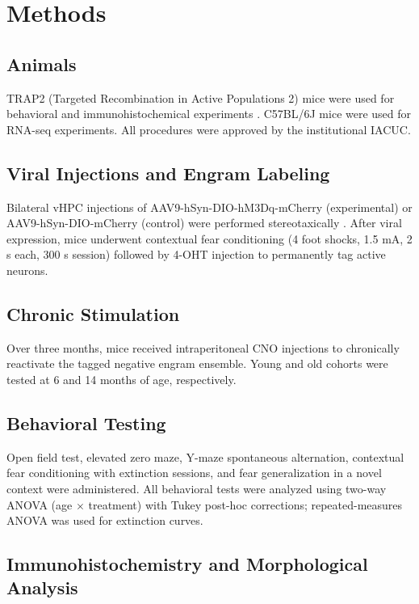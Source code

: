 \documentclass[11pt]{article}
\begin{document}
\section{Methods}

\subsection{Animals}

TRAP2 (Targeted Recombination in Active Populations 2) mice were used for behavioral and immunohistochemical experiments \citep{denofrioRyan2022}. C57BL/6J mice were used for RNA-seq experiments. All procedures were approved by the institutional IACUC.

\subsection{Viral Injections and Engram Labeling}

Bilateral vHPC injections of AAV9-hSyn-DIO-hM3Dq-mCherry (experimental) or AAV9-hSyn-DIO-mCherry (control) were performed stereotaxically \citep{roth2016dreadds}. After viral expression, mice underwent contextual fear conditioning (4 foot shocks, 1.5 mA, 2 s each, 300 s session) followed by 4-OHT injection to permanently tag active neurons.

\subsection{Chronic Stimulation}

Over three months, mice received intraperitoneal CNO injections to chronically reactivate the tagged negative engram ensemble. Young and old cohorts were tested at 6 and 14 months of age, respectively.

\subsection{Behavioral Testing}

Open field test, elevated zero maze, Y-maze spontaneous alternation, contextual fear conditioning with extinction sessions, and fear generalization in a novel context were administered. All behavioral tests were analyzed using two-way ANOVA (age $\times$ treatment) with Tukey post-hoc corrections; repeated-measures ANOVA was used for extinction curves.

\subsection{Immunohistochemistry and Morphological Analysis}
\end{document}
